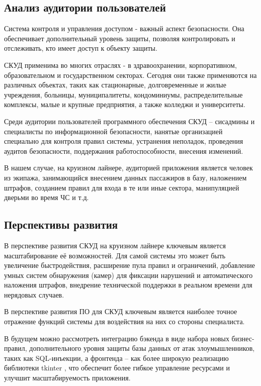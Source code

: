 \subsection{Анализ аудитории пользователей}

Система контроля и управления доступом - важный аспект безопасности. Она обеспечивает дополнительный уровень защиты, позволяя контролировать и отслеживать, кто имеет доступ к объекту защиты.

СКУД применима во многих отраслях - в здравоохранении, корпоративном, образовательном и государственном секторах. Сегодня они также применяются на различных объектах, таких как стационарные, долговременные и жилые учреждения, больницы, муниципалитеты, кондоминиумы, распределительные комплексы, малые и крупные предприятия, а также колледжи и университеты.

Среди аудитории пользователей программного обеспечения СКУД -- сисадмины и специалисты по информационной безопасности, нанятые организацией специально для контроля правил системы, устранения неполадок, проведения аудитов безопасности, поддержания работоспособности, внесения изменений.

В нашем случае, на круизном лайнере, аудиторией приложения является человек из экипажа, занимающийся внесением данных пассажиров в базу, наложением штрафов, созданием правил для входа в те или иные сектора, манипуляцией дверьми во время ЧС и т.д.

\subsection{Перспективы развития}
В перспективе развития СКУД на круизном лайнере ключевым является масштабирование её возможностей. Для самой системы это может быть увеличение быстродействия, расширение пула правил и ограничений, добавление умных систем обнаружения (камер) для фиксации нарушений и автоматического наложения штрафов, внедрение технической поддержки в реальном времени для нерядовых случаев.

В перспективе развития ПО для СКУД ключевым является наиболее точное отражение функций системы для воздействия на них со стороны специалиста.

В будущем можно рассмотреть интеграцию бэкенда в виде набора новых бизнес-правил, дополнительного уровня защиты базы данных от атак злоумышленников, таких как SQL-инъекции, а фронтенда – как более широкую реализацию библиотеки \textquotedbl tkinter \textquotedbl, что обеспечит более гибкое управление ресурсами и улучшит масштабируемость приложения.

